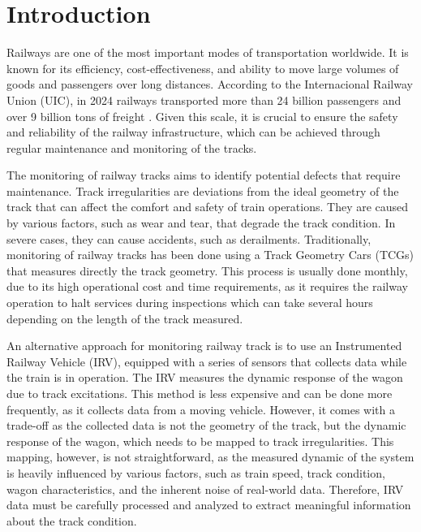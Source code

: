 \chapter[Introduction]{Introduction}

Railways are one of the most important modes of transportation worldwide. It is known for its efficiency, cost-effectiveness, and ability to move large volumes of goods and passengers over long distances. According to the Internacional Railway Union (UIC), in 2024 railways transported more than 24 billion passengers and over 9 billion tons of freight \cite{UIC_2024}. Given this scale, it is crucial to ensure the safety and reliability of the railway infrastructure, which can be achieved through regular maintenance and monitoring of the tracks.  

The monitoring of railway tracks aims to identify potential defects that require maintenance. Track irregularities are deviations from the ideal geometry of the track that can affect the comfort and safety of train operations. They are caused by various factors, such as wear and tear, that degrade the track condition. In severe cases, they can cause accidents, such as derailments. Traditionally, monitoring of railway tracks has been done using a Track Geometry Cars (TCGs) that measures directly the track geometry. This process is usually done monthly, due to its high operational cost and time requirements, as it requires the railway operation to halt services during inspections which can take several hours depending on the length of the track measured.

An alternative approach for monitoring railway track is to use an Instrumented Railway Vehicle (IRV), equipped with a series of sensors that collects data while the train is in operation. The IRV measures the dynamic response of the wagon due to track excitations. This method is less expensive and can be done more frequently, as it collects data from a moving vehicle. However, it comes with a trade-off as the collected data is not the geometry of the track, but the dynamic response of the wagon, which needs to be mapped to track irregularities. This mapping, however, is not straightforward, as the measured dynamic of the system is heavily influenced by various factors, such as train speed, track condition, wagon characteristics, and the inherent noise of real-world data. Therefore, IRV data must be carefully processed and analyzed to extract meaningful information about the track condition.

